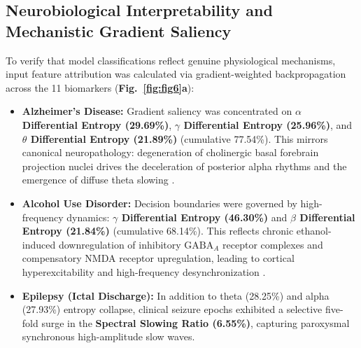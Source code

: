 \documentclass[11pt,a4paper]{article}
\begin{document}
\subsection{Neurobiological Interpretability and Mechanistic Gradient Saliency}
To verify that model classifications reflect genuine physiological mechanisms, input feature attribution was calculated via gradient-weighted backpropagation across the 11 biomarkers (\textbf{Fig.~\ref{fig:fig6}a}):
\begin{itemize}
    \item \textbf{Alzheimer's Disease:} Gradient saliency was concentrated on \textbf{$\alpha$ Differential Entropy (29.69\%)}, \textbf{$\gamma$ Differential Entropy (25.96\%)}, and \textbf{$\theta$ Differential Entropy (21.89\%)} (cumulative 77.54\%). This mirrors canonical neuropathology: degeneration of cholinergic basal forebrain projection nuclei drives the deceleration of posterior alpha rhythms and the emergence of diffuse theta slowing \cite{babiloni2020,sverrisson2026lookaroundnet}.
    \item \textbf{Alcohol Use Disorder:} Decision boundaries were governed by high-frequency dynamics: \textbf{$\gamma$ Differential Entropy (46.30\%)} and \textbf{$\beta$ Differential Entropy (21.84\%)} (cumulative 68.14\%). This reflects chronic ethanol-induced downregulation of inhibitory $\text{GABA}_A$ receptor complexes and compensatory NMDA receptor upregulation, leading to cortical hyperexcitability and high-frequency desynchronization \cite{enoch2008}.
    \item \textbf{Epilepsy (Ictal Discharge):} In addition to theta (28.25\%) and alpha (27.93\%) entropy collapse, clinical seizure epochs exhibited a selective five-fold surge in the \textbf{Spectral Slowing Ratio (6.55\%)}, capturing paroxysmal synchronous high-amplitude slow waves.
\end{itemize}
\end{document}
